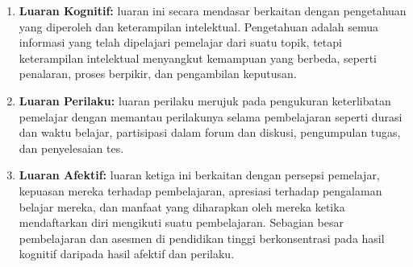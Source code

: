 \begin{enumerate}
    \item \textbf{Luaran Kognitif:} luaran ini secara mendasar berkaitan dengan pengetahuan yang diperoleh dan
    keterampilan intelektual. Pengetahuan adalah semua informasi yang telah dipelajari
    pemelajar dari suatu topik, tetapi keterampilan intelektual menyangkut kemampuan yang
    berbeda, seperti penalaran, proses berpikir, dan pengambilan keputusan.

    \item \textbf{Luaran Perilaku:} luaran perilaku merujuk pada pengukuran keterlibatan pemelajar dengan memantau
    perilakunya selama pembelajaran seperti durasi dan waktu belajar, partisipasi dalam
    forum dan diskusi, pengumpulan tugas, dan penyelesaian tes.

    \item \textbf{Luaran Afektif:} luaran ketiga ini berkaitan dengan persepsi pemelajar, kepuasan mereka terhadap pembelajaran,
    apresiasi terhadap pengalaman belajar mereka, dan manfaat yang diharapkan oleh mereka
    ketika mendaftarkan diri mengikuti suatu pembelajaran. Sebagian besar pembelajaran dan
    asesmen di pendidikan tinggi berkonsentrasi pada hasil kognitif daripada hasil afektif
    dan perilaku.
\end{enumerate}

